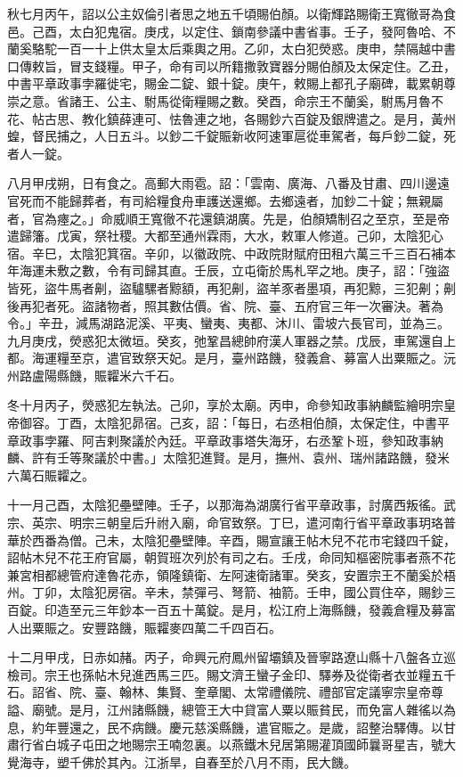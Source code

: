 \begin{pinyinscope}
 秋七月丙午，詔以公主奴倫引者思之地五千頃賜伯顏。以衛輝路賜衛王寬徹哥為食邑。己酉，太白犯鬼宿。庚戌，以定住、鎖南參議中書省事。壬子，發阿魯哈、不蘭奚駱駝一百一十上供太皇太后乘輿之用。乙卯，太白犯熒惑。庚申，禁隔越中書口傳敕旨，冒支錢糧。甲子，命有司以所籍撒敦寶器分賜伯顏及太保定住。乙丑，中書平章政事孛羅徙宅，賜金二錠、銀十錠。庚午，敕賜上都孔子廟碑，載累朝尊崇之意。省諸王、公主、駙馬從衛糧賜之數。癸酉，命宗王不蘭奚，駙馬月魯不花、帖古思、教化鎮薛連可、怯魯連之地，各賜鈔六百錠及銀牌遣之。是月，黃州蝗，督民捕之，人日五斗。以鈔二千錠賑新收阿速軍扈從車駕者，每戶鈔二錠，死者人一錠。



 八月甲戌朔，日有食之。高郵大雨雹。詔：「雲南、廣海、八番及甘肅、四川邊遠官死而不能歸葬者，有司給糧食舟車護送還鄉。去鄉遠者，加鈔二十錠；無親屬者，官為瘞之。」命威順王寬徹不花還鎮湖廣。先是，伯顏矯制召之至京，至是帝遣歸籓。戊寅，祭社稷。大都至通州霖雨，大水，敕軍人修道。己卯，太陰犯心宿。辛巳，太陰犯箕宿。辛卯，以徽政院、中政院財賦府田租六萬三千三百石補本年海運未敷之數，令有司歸其直。壬辰，立屯衛於馬札罕之地。庚子，詔：「強盜皆死，盜牛馬者劓，盜驢騾者黥額，再犯劓，盜羊豕者墨項，再犯黥，三犯劓；劓後再犯者死。盜諸物者，照其數估價。省、院、臺、五府官三年一次審決。著為令。」辛丑，減馬湖路泥溪、平夷、蠻夷、夷都、沐川、雷坡六長官司，並為三。九月庚戌，熒惑犯太微垣。癸亥，弛鞏昌總帥府漢人軍器之禁。戊辰，車駕還自上都。海運糧至京，遣官致祭天妃。是月，臺州路饑，發義倉、募富人出粟賑之。沅州路盧陽縣饑，賑糶米六千石。



 冬十月丙子，熒惑犯左執法。己卯，享於太廟。丙申，命參知政事納麟監繪明宗皇帝御容。丁酉，太陰犯昴宿。己亥，詔：「每日，右丞相伯顏，太保定住，中書平章政事孛羅、阿吉剌聚議於內廷。平章政事塔失海牙，右丞鞏卜班，參知政事納麟、許有壬等聚議於中書。」太陰犯進賢。是月，撫州、袁州、瑞州諸路饑，發米六萬石賑糶之。



 十一月己酉，太陰犯壘壁陣。壬子，以那海為湖廣行省平章政事，討廣西叛徭。武宗、英宗、明宗三朝皇后升祔入廟，命官致祭。丁巳，遣河南行省平章政事玥珞普華於西番為僧。己未，太陰犯壘壁陣。辛酉，賜宣讓王帖木兒不花市宅錢四千錠，詔帖木兒不花王府官屬，朝賀班次列於有司之右。壬戌，命同知樞密院事者燕不花兼宮相都總管府達魯花赤，領隆鎮衛、左阿速衛諸軍。癸亥，安置宗王不蘭奚於梧州。丁卯，太陰犯房宿。辛未，禁彈弓、弩箭、袖箭。壬申，國公買住卒，賜鈔三百錠。印造至元三年鈔本一百五十萬錠。是月，松江府上海縣饑，發義倉糧及募富人出粟賑之。安豐路饑，賑糶麥四萬二千四百石。



 十二月甲戌，日赤如赭。丙子，命興元府鳳州留壩鎮及晉寧路遼山縣十八盤各立巡檢司。宗王也孫帖木兒進西馬三匹。賜文濟王蠻子金印、驛券及從衛者衣並糧五千石。詔省、院、臺、翰林、集賢、奎章閣、太常禮儀院、禮部官定議寧宗皇帝尊謚、廟號。是月，江州諸縣饑，總管王大中貸富人粟以賑貧民，而免富人雜徭以為息，約年豐還之，民不病饑。慶元慈溪縣饑，遣官賑之。是歲，詔整治驛傳。以甘肅行省白城子屯田之地賜宗王喃忽裏。以燕鐵木兒居第賜灌頂國師曩哥星吉，號大覺海寺，塑千佛於其內。江浙旱，自春至於八月不雨，民大饑。




\end{pinyinscope}
